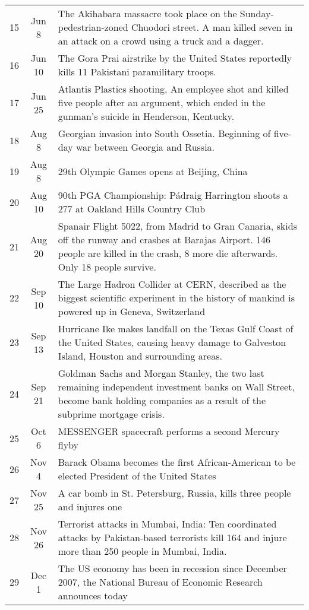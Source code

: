 \documentclass[a4paper]{article}
\begin{document}
\begin{center}
\begin{tabularx}{\linewidth}{@{}c @{}c X@{}}
15 & Jun 8 & The Akihabara massacre took place on the Sunday-pedestrian-zoned Chuodori street. A man killed seven in an attack on a crowd using a truck and a dagger. \\
16 & Jun 10 & The Gora Prai airstrike by the United States reportedly kills 11 Pakistani paramilitary troops. \\
17 & Jun 25 & Atlantis Plastics shooting, An employee shot and killed five people after an argument, which ended in the gunman's suicide in Henderson, Kentucky. \\
18 & Aug 8 & Georgian invasion into South Ossetia. Beginning of five-day war between Georgia and Russia. \\
19 & Aug 8 & 29th Olympic Games opens at Beijing, China \\
20 & Aug 10 & 90th PGA Championship: Pádraig Harrington shoots a 277 at Oakland Hills Country Club \\
21 & Aug 20 & Spanair Flight 5022, from Madrid to Gran Canaria, skids off the runway and crashes at Barajas Airport. 146 people are killed in the crash, 8 more die afterwards. Only 18 people survive. \\
22 & Sep 10 & The Large Hadron Collider at CERN, described as the biggest scientific experiment in the history of mankind is powered up in Geneva, Switzerland \\
23 & Sep 13 & Hurricane Ike makes landfall on the Texas Gulf Coast of the United States, causing heavy damage to Galveston Island, Houston and surrounding areas. \\
24 & Sep 21 & Goldman Sachs and Morgan Stanley, the two last remaining independent investment banks on Wall Street, become bank holding companies as a result of the subprime mortgage crisis. \\
25 & Oct 6 & MESSENGER spacecraft performs a second Mercury flyby \\
26 & Nov 4 & Barack Obama becomes the first African-American to be elected President of the United States \\
27 & Nov 25 & A car bomb in St. Petersburg, Russia, kills three people and injures one \\
28 & Nov 26 & Terrorist attacks in Mumbai, India: Ten coordinated attacks by Pakistan-based terrorists kill 164 and injure more than 250 people in Mumbai, India. \\
29 & Dec 1 & The US economy has been in recession since December 2007, the National Bureau of Economic Research announces today \\

\end{tabularx}
\end{center}
\end{document}
